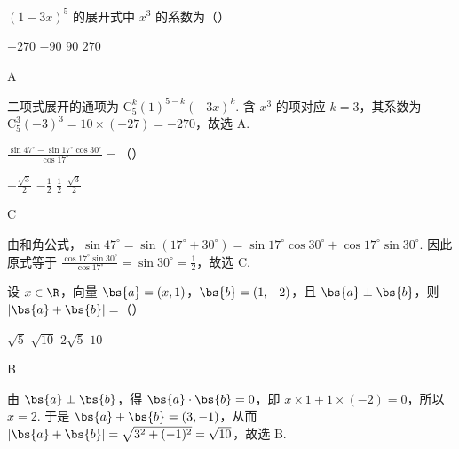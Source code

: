 \begin{problem}
\((1-3x)^5\) 的展开式中 \(x^3\) 的系数为（\quad）

\choices
    {\(-270\)}
    {\(-90\)}
    {\(90\)}
    {\(270\)}

\begin{answer}
A
\end{answer}

\begin{solution}
二项式展开的通项为 \(\mathrm C_5^k(1)^{5-k}(-3x)^k\). 含 \(x^3\) 的项对应 \(k=3\)，其系数为 \(\mathrm C_5^3(-3)^3=10\times(-27)=-270\)，故选 A.
\end{solution}
\end{problem}

\begin{problem}
\(\frac{\sin 47^{\circ}-\sin 17^{\circ}\cos 30^{\circ}}{\cos 17^{\circ}}=\)（\quad）

\choices
    {\(-\frac{\sqrt{3}}{2}\)}
    {\(-\frac{1}{2}\)}
    {\(\frac{1}{2}\)}
    {\(\frac{\sqrt{3}}{2}\)}

\begin{answer}
C
\end{answer}

\begin{solution}
由和角公式，\(\sin47^{\circ}=\sin(17^{\circ}+30^{\circ})=\sin17^{\circ}\cos30^{\circ}+\cos17^{\circ}\sin30^{\circ}\). 因此原式等于 \(\frac{\cos17^{\circ}\sin30^{\circ}}{\cos17^{\circ}}=\sin30^{\circ}=\frac{1}{2}\)，故选 C.
\end{solution}
\end{problem}

\begin{problem}
设 \(x\in\R\)，向量 \(\bs{a}=(x,1)\)，\(\bs{b}=(1,-2)\)，且 \(\bs{a}\perp\bs{b}\)，则 \(|\bs{a}+\bs{b}|=\)（\quad）

\choices
    {\(\sqrt{5}\)}
    {\(\sqrt{10}\)}
    {\(2\sqrt{5}\)}
    {\(10\)}

\begin{answer}
B
\end{answer}

\begin{solution}
由 \(\bs{a}\perp\bs{b}\)，得 \(\bs{a}\cdot\bs{b}=0\)，即 \(x\times1+1\times(-2)=0\)，所以 \(x=2\). 于是 \(\bs{a}+\bs{b}=(3,-1)\)，从而 \(|\bs{a}+\bs{b}|=\sqrt{3^2+(-1)^2}=\sqrt{10}\)，故选 B.
\end{solution}
\end{problem}

